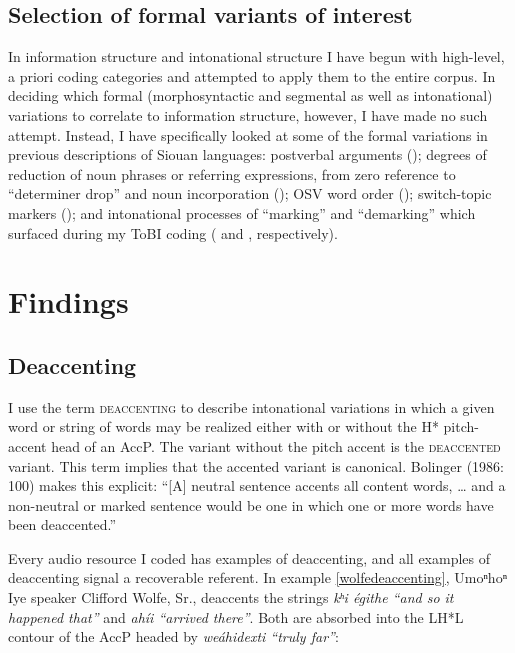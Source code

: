 \documentclass[output=paper]{LSP/langsci}
\begin{document}
\subsection{Selection of formal variants of interest}\label{variantselection}

In information structure and intonational structure I have begun with high-level, a priori coding categories and attempted to apply them to the entire corpus. In deciding which formal (morphosyntactic and segmental as well as intonational) variations to correlate to information structure, however, I have made no such attempt. Instead, I have specifically looked at some of the formal variations in previous descriptions of Siouan languages: postverbal arguments (); degrees of reduction of noun phrases or referring expressions, from zero reference to “determiner drop” and noun incorporation (); OSV word order (); switch-topic markers (); and intonational processes of “marking” and “demarking” which surfaced during my ToBI coding ( and , respectively).

\section{Findings}\label{findings}

\subsection{Deaccenting}\label{deaccenting}

	I use the term \textsc{deaccenting} to describe intonational variations in which a given word or string of words may be realized either with or without the H* pitch-accent head of an AccP. The variant without the pitch accent is the \textsc{deaccented} variant. This term implies that the accented variant is canonical. Bolinger (1986: 100) makes this explicit: “[A] neutral sentence accents all content words, … and a non-neutral or marked sentence would be one in which one or more words have been deaccented.”
	
Every audio resource I coded has examples of deaccenting, and all examples of deaccenting signal a recoverable referent. In example \ref{wolfedeaccenting}, Umoⁿhoⁿ Iye speaker Clifford Wolfe, Sr., deaccents the strings \textit{kʰi égithe “and so it happened that”} and \textit{ahíi “arrived there”}. Both are absorbed into the LH*L contour of the AccP headed by \textit{weáhidexti “truly far”}:
\end{document}
